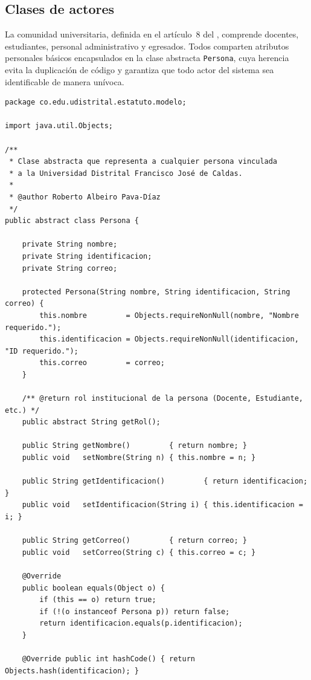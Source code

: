 \subsection{Clases de actores}
\label{subsec:actores}

La comunidad universitaria, definida en el artículo~8 del \acuerdo, comprende docentes,
estudiantes, personal administrativo y egresados. Todos comparten atributos personales
básicos encapsulados en la clase abstracta \texttt{Persona}, cuya herencia evita la
duplicación de código y garantiza que todo actor del sistema sea identificable
de manera unívoca.

\begin{lstlisting}[style=javaStyle, caption={Clase abstracta \texttt{Persona} y enumeraciones de actor}, label={lst:persona}]
package co.edu.udistrital.estatuto.modelo;

import java.util.Objects;

/**
 * Clase abstracta que representa a cualquier persona vinculada
 * a la Universidad Distrital Francisco José de Caldas.
 *
 * @author Roberto Albeiro Pava-Díaz
 */
public abstract class Persona {

    private String nombre;
    private String identificacion;
    private String correo;

    protected Persona(String nombre, String identificacion, String correo) {
        this.nombre         = Objects.requireNonNull(nombre, "Nombre requerido.");
        this.identificacion = Objects.requireNonNull(identificacion, "ID requerido.");
        this.correo         = correo;
    }

    /** @return rol institucional de la persona (Docente, Estudiante, etc.) */
    public abstract String getRol();

    public String getNombre()         { return nombre; }
    public void   setNombre(String n) { this.nombre = n; }

    public String getIdentificacion()         { return identificacion; }
    public void   setIdentificacion(String i) { this.identificacion = i; }

    public String getCorreo()         { return correo; }
    public void   setCorreo(String c) { this.correo = c; }

    @Override
    public boolean equals(Object o) {
        if (this == o) return true;
        if (!(o instanceof Persona p)) return false;
        return identificacion.equals(p.identificacion);
    }

    @Override public int hashCode() { return Objects.hash(identificacion); }


\end{lstlisting}
